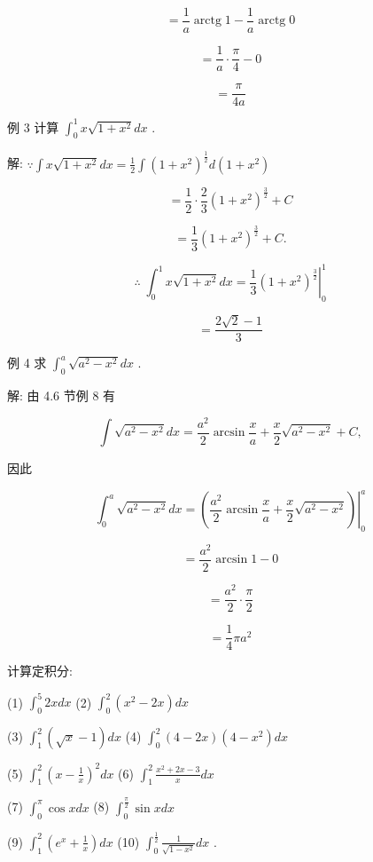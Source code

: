 \documentclass[lang=cn,newtx,12pt,scheme=chinese]{elegantbook}
\begin{document}
\[
= \frac{1}{a}\operatorname{arctg}1 - \frac{1}{a}\operatorname{arctg}0
\]

\[
= \frac{1}{a} \cdot \frac{\pi }{4} - 0
\]

\[
= \frac{\pi }{4a}
\]

例 3 计算 \({\int }_{0}^{1}x\sqrt{1 + {x}^{2}}{dx}\) .

解: \(\because \int x\sqrt{1 + {x}^{2}}{dx} = \frac{1}{2}\int {\left( 1 + {x}^{2}\right) }^{\frac{1}{2}}d\left( {1 + {x}^{2}}\right)\)

\[
= \frac{1}{2} \cdot \frac{2}{3}{\left( 1 + {x}^{2}\right) }^{\frac{3}{2}} + C
\]

\[
= \frac{1}{3}{\left( 1 + {x}^{2}\right) }^{\frac{3}{2}} + C\text{.}
\]

\[
\therefore \;{\int }_{0}^{1}x\sqrt{1 + {x}^{2}}{dx} = {\left. \frac{1}{3}{\left( 1 + {x}^{2}\right) }^{\frac{3}{2}}\right| }_{0}^{1}
\]

\[
= \frac{2\sqrt{2} - 1}{3}
\]

例 4 求 \({\int }_{0}^{a}\sqrt{{a}^{2} - {x}^{2}}{dx}\) .

解: 由 4.6 节例 8 有

\[
\int \sqrt{{a}^{2} - {x}^{2}}{dx} = \frac{{a}^{2}}{2}\arcsin \frac{x}{a} + \frac{x}{2}\sqrt{{a}^{2} - {x}^{2}} + C,
\]

因此

\[
{\int }_{0}^{a}\sqrt{{a}^{2} - {x}^{2}}{dx} = {\left. \left( \frac{{a}^{2}}{2}\arcsin \frac{x}{a} + \frac{x}{2}\sqrt{{a}^{2} - {x}^{2}}\right) \right| }_{0}^{a}
\]

\[
= \frac{{a}^{2}}{2}\arcsin 1 - 0
\]

\[
= \frac{{a}^{2}}{2} \cdot \frac{\pi }{2}
\]

\[
= \frac{1}{4}\pi {a}^{2}
\]

\begin{problemset}[练习]

\item 计算定积分:

(1) \({\int }_{0}^{5}{2xdx}\) (2) \({\int }_{0}^{2}\left( {{x}^{2} - {2x}}\right) {dx}\)

(3) \({\int }_{1}^{2}\left( {\sqrt{x} - 1}\right) {dx}\) (4) \({\int }_{0}^{2}\left( {4 - {2x}}\right) \left( {4 - {x}^{2}}\right) {dx}\)

(5) \({\int }_{1}^{2}{\left( x - \frac{1}{x}\right) }^{2}{dx}\) (6) \({\int }_{1}^{2}\frac{{x}^{2} + {2x} - 3}{x}{dx}\)

(7) \({\int }_{0}^{\pi }\cos {xdx}\) (8) \({\int }_{0}^{\frac{\pi }{2}}\sin {xdx}\)

(9) \({\int }_{1}^{2}\left( {{e}^{x} + \frac{1}{x}}\right) {dx}\) (10) \({\int }_{0}^{\frac{1}{2}}\frac{1}{\sqrt{1 - {x}^{2}}}{dx}\) .

\end{problemset}
\end{document}

